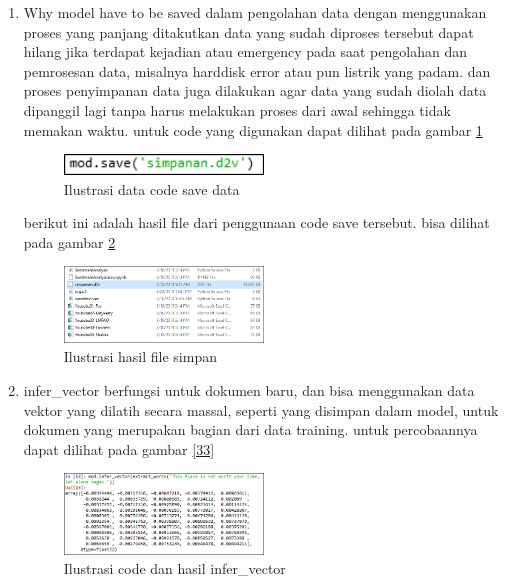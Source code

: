 \begin{enumerate}
\item Why model have to be saved
\subitem dalam pengolahan data dengan menggunakan proses yang panjang ditakutkan data yang sudah diproses tersebut dapat hilang jika terdapat kejadian atau emergency pada saat pengolahan dan pemrosesan data, misalnya harddisk error atau pun listrik yang padam. dan proses penyimpanan data juga dilakukan agar data yang sudah diolah data dipanggil lagi tanpa harus melakukan proses dari awal sehingga tidak memakan waktu. untuk code yang digunakan dapat dilihat pada gambar \ref{fig31}

\begin{figure}[!htbp]
	\centering
	\includegraphics[width=0.5\textwidth]{figures/fathi/chapter5/hari3/12}
	\caption{Ilustrasi data code save data}
	\label{fig31}
\end{figure}

berikut ini adalah hasil file dari penggunaan code save tersebut. bisa dilihat pada gambar \ref{fig32}
\begin{figure}[!htbp]
	\centering
	\includegraphics[width=0.5\textwidth]{figures/fathi/chapter5/hari3/13}
	\caption{Ilustrasi hasil file simpan}
	\label{fig32}
\end{figure}

\item infer\_vector
\subitem berfungsi untuk dokumen baru, dan  bisa menggunakan data vektor yang dilatih secara massal, seperti yang disimpan dalam model, untuk dokumen yang merupakan bagian dari data training. untuk percobaannya dapat dilihat pada gambar \ref{33}
\begin{figure}[!htbp]
	\centering
	\includegraphics[width=0.5\textwidth]{figures/fathi/chapter5/hari3/14}
	\caption{Ilustrasi code dan hasil infer\_vector}
	\label{fig33}
\end{figure}


\end{enumerate}
